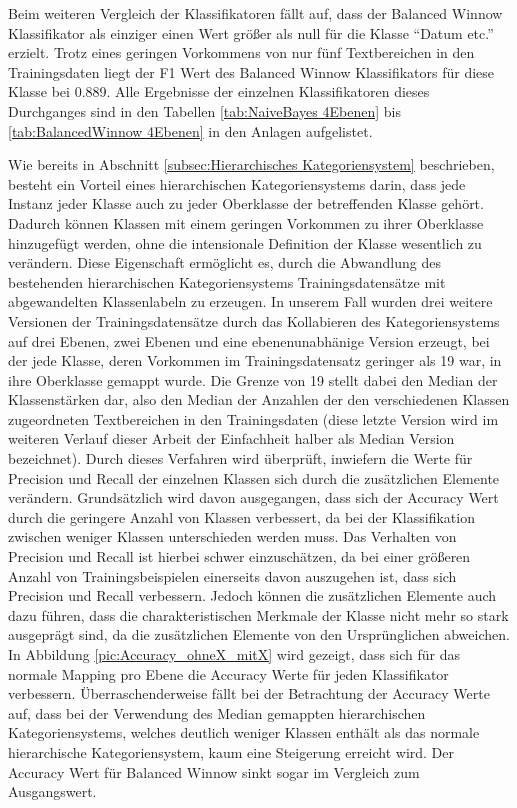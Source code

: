 Beim weiteren Vergleich der Klassifikatoren fällt auf, dass der Balanced Winnow Klassifikator als einziger einen Wert größer als null für die Klasse "`Datum etc."' erzielt. Trotz eines geringen Vorkommens von nur fünf Textbereichen in den Trainingsdaten liegt der F1 Wert des Balanced Winnow Klassifikators für diese Klasse bei 0.889. Alle Ergebnisse der einzelnen Klassifikatoren dieses Durchganges sind in den Tabellen \ref{tab:NaiveBayes 4Ebenen} bis \ref{tab:BalancedWinnow 4Ebenen} in den Anlagen aufgelistet.

Wie bereits in Abschnitt \ref{subsec:Hierarchisches Kategoriensystem} beschrieben, besteht ein Vorteil eines hierarchischen Kategoriensystems darin, dass jede Instanz jeder Klasse auch zu jeder Oberklasse der betreffenden Klasse gehört. Dadurch können Klassen mit einem geringen Vorkommen zu ihrer Oberklasse hinzugefügt werden, ohne die intensionale Definition der Klasse wesentlich zu verändern. Diese Eigenschaft ermöglicht es, durch die Abwandlung des bestehenden hierarchischen Kategoriensystems Trainingsdatensätze mit abgewandelten Klassenlabeln zu erzeugen. In unserem Fall wurden drei weitere Versionen der Trainingsdatensätze durch das Kollabieren des Kategoriensystems auf drei Ebenen, zwei Ebenen und eine ebenenunabhänige Version erzeugt, bei der jede Klasse, deren Vorkommen im Trainingsdatensatz geringer als 19 war, in ihre Oberklasse gemappt wurde. Die Grenze von 19 stellt dabei den Median der Klassenstärken dar, also den Median der Anzahlen der den verschiedenen Klassen zugeordneten Textbereichen in den Trainingsdaten (diese letzte Version wird im weiteren Verlauf dieser Arbeit der Einfachheit halber als Median Version bezeichnet). Durch dieses Verfahren wird überprüft, inwiefern die Werte für Precision und Recall der einzelnen Klassen sich durch die zusätzlichen Elemente verändern. Grundsätzlich wird davon ausgegangen, dass sich der Accuracy Wert durch die geringere Anzahl von Klassen verbessert, da bei der Klassifikation zwischen weniger Klassen unterschieden werden muss. Das Verhalten von Precision und Recall ist hierbei schwer einzuschätzen, da bei einer größeren Anzahl von Trainingsbeispielen einerseits davon auszugehen ist, dass sich Precision und Recall verbessern. Jedoch können die zusätzlichen Elemente auch dazu führen, dass die charakteristischen Merkmale der Klasse nicht mehr so stark ausgeprägt sind, da die zusätzlichen Elemente von den Ursprünglichen abweichen. In Abbildung \ref{pic:Accuracy_ohneX_mitX} wird gezeigt, dass sich für das normale Mapping pro Ebene die Accuracy Werte für jeden Klassifikator verbessern. Überraschenderweise fällt bei der Betrachtung der Accuracy Werte auf, dass bei der Verwendung des Median gemappten hierarchischen Kategoriensystems, welches deutlich weniger Klassen enthält als das normale hierarchische Kategoriensystem, kaum eine Steigerung erreicht wird. Der Accuracy Wert für Balanced Winnow sinkt sogar im Vergleich zum Ausgangswert. 

